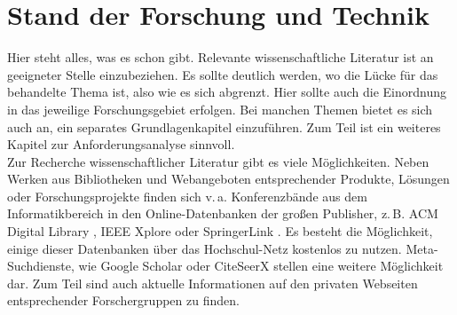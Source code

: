 \section{Stand der Forschung und Technik}\label{chap:sota}
Hier steht alles, was es schon gibt. Relevante wissenschaftliche Literatur ist an geeigneter Stelle einzubeziehen. Es sollte deutlich werden, wo die Lücke für das behandelte Thema ist, also wie es sich abgrenzt. Hier sollte auch die Einordnung in das jeweilige Forschungsgebiet erfolgen. Bei manchen Themen bietet es sich auch an, ein separates Grundlagenkapitel einzuführen. Zum Teil ist ein weiteres Kapitel zur Anforderungsanalyse sinnvoll.\\
Zur Recherche wissenschaftlicher Literatur gibt es viele Möglichkeiten. Neben Werken aus Bibliotheken und Webangeboten entsprechender Produkte, Lösungen oder Forschungsprojekte finden sich v.\,a. Konferenzbände aus dem Informatikbereich in den Online-Datenbanken der großen Publisher, z.\,B. ACM Digital Library \cite{acmdl}, IEEE Xplore \cite{ieeeexplore} oder SpringerLink \cite{springerlink}. Es besteht die Möglichkeit, einige dieser Datenbanken über das Hochschul-Netz kostenlos zu nutzen. Meta-Suchdienste, wie Google Scholar \cite{googlescholar} oder CiteSeerX \cite{citeseerx} stellen eine weitere Möglichkeit dar. Zum Teil sind auch aktuelle Informationen auf den privaten Webseiten entsprechender Forschergruppen zu finden.


\cleardoublepage

\begin{comment}
\section{Theoretische Grundlagen}\label{chap:sota}
\subsection{Einführung Projektmanagement}\label{sec:introductionpm}


\subsection{Einführung <Schwerpunkt>}\label{sec:introductiondevops}



\begin{table}[ht]
	\centering
	\caption{Einbindung von Abkürzungen SOTA mit  \texttt{glossaries}}
	\label{tab:glossariesusage}
	\begin{tabular}{ll} \toprule
		\textbackslash{}gls\{\} & Normale Einbindung (lange Form beim ersten Auftreten)\\
		\textbackslash{}Gls\{\} & Einbindung mit großem Anfangsbuchstaben\\
		\textbackslash{}glspl\{\} & Pluralform (mit s oder wie angegeben)\\
		\textbackslash{}glslink\{\}\{\} & Anzeige eines beliebigen anderen Textes\\
		\bottomrule
	\end{tabular}
\end{table}
\end{comment}
